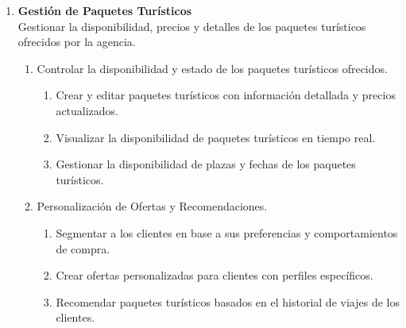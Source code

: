 \begin{enumerate}[label=\textcolor{red}{RF-\arabic*.}]
    \item \textbf{Gestión de Paquetes Turísticos} \\ 
    Gestionar la disponibilidad, precios y detalles de los paquetes turísticos ofrecidos por la agencia.
    \begin{enumerate}[label=\textcolor{red}{RF-1.\arabic*}]
        \item Controlar la disponibilidad y estado de los paquetes turísticos ofrecidos.
        \begin{enumerate}[label=\textcolor{red}{RF-1.1.\arabic*}]
            \item Crear y editar paquetes turísticos con información detallada y precios actualizados.
            \item Visualizar la disponibilidad de paquetes turísticos en tiempo real.
            \item Gestionar la disponibilidad de plazas y fechas de los paquetes turísticos.
        \end{enumerate}
        \item Personalización de Ofertas y Recomendaciones.
        \begin{enumerate}[label=\textcolor{red}{RF-1.2.\arabic*}]
            \item Segmentar a los clientes en base a sus preferencias y comportamientos de compra.
            \item Crear ofertas personalizadas para clientes con perfiles específicos.
            \item Recomendar paquetes turísticos basados en el historial de viajes de los clientes.
        \end{enumerate}
    \end{enumerate}


\end{enumerate}
